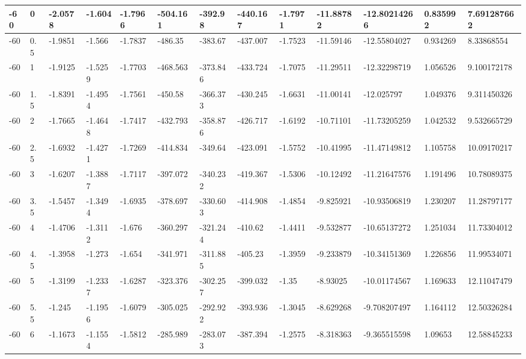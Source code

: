 \begin{longtable}{|l|l|l|l|l|l|l|l|l|l|l|l|l|}
-60   & 0     & -2.0578 & -1.604  & -1.7966 & -504.161 & -392.98  & -440.167 & -1.7971  & -11.88782   & -12.80214266   & 0.835992                 & 7.691287662 \\ \hline
-60   & 0.5   & -1.9851 & -1.566  & -1.7837 & -486.35  & -383.67  & -437.007 & -1.7523  & -11.59146   & -12.55804027   & 0.934269                 & 8.33868554  \\ \hline
-60   & 1     & -1.9125 & -1.5259 & -1.7703 & -468.563 & -373.846 & -433.724 & -1.7075  & -11.29511   & -12.32298719   & 1.056526                 & 9.100172178 \\ \hline
-60   & 1.5   & -1.8391 & -1.4954 & -1.7561 & -450.58  & -366.373 & -430.245 & -1.6631  & -11.00141   & -12.025797     & 1.049376                 & 9.311450326 \\ \hline
-60   & 2     & -1.7665 & -1.4648 & -1.7417 & -432.793 & -358.876 & -426.717 & -1.6192  & -10.71101   & -11.73205259   & 1.042532                 & 9.532665729 \\ \hline
-60   & 2.5   & -1.6932 & -1.4271 & -1.7269 & -414.834 & -349.64  & -423.091 & -1.5752  & -10.41995   & -11.47149812   & 1.105758                 & 10.09170217 \\ \hline
-60   & 3     & -1.6207 & -1.3887 & -1.7117 & -397.072 & -340.232 & -419.367 & -1.5306  & -10.12492   & -11.21647576   & 1.191496                 & 10.78089375 \\ \hline
-60   & 3.5   & -1.5457 & -1.3494 & -1.6935 & -378.697 & -330.603 & -414.908 & -1.4854  & -9.825921   & -10.93506819   & 1.230207                 & 11.28797177 \\ \hline
-60   & 4     & -1.4706 & -1.3112 & -1.676  & -360.297 & -321.244 & -410.62  & -1.4411  & -9.532877   & -10.65137272   & 1.251034                 & 11.73304012 \\ \hline
-60   & 4.5   & -1.3958 & -1.273  & -1.654  & -341.971 & -311.885 & -405.23  & -1.3959  & -9.233879   & -10.34151369   & 1.226856                 & 11.99534071 \\ \hline
-60   & 5     & -1.3199 & -1.2337 & -1.6287 & -323.376 & -302.257 & -399.032 & -1.35    & -8.93025    & -10.01174567   & 1.169633                 & 12.11047479 \\ \hline
-60   & 5.5   & -1.245  & -1.1956 & -1.6079 & -305.025 & -292.922 & -393.936 & -1.3045  & -8.629268   & -9.708207497   & 1.164112                 & 12.50326284 \\ \hline
-60   & 6     & -1.1673 & -1.1554 & -1.5812 & -285.989 & -283.073 & -387.394 & -1.2575  & -8.318363   & -9.365515598   & 1.09653                  & 12.58845233 \\ \hline

\end{longtable}
